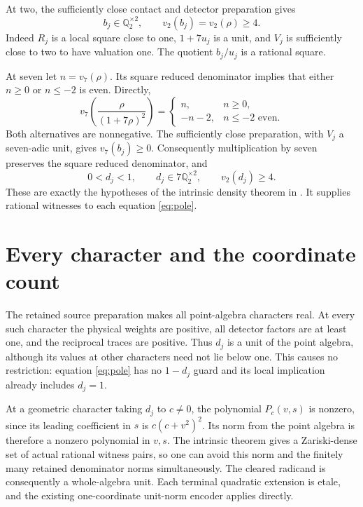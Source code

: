 \documentclass[11pt,a4paper]{article}
\newcommand{\Q}{\mathbb Q}
\begin{document}
At two, the sufficiently close contact and detector preparation gives
\[
 b_j\in\Q_2^{\times2},\qquad
 v_2(b_j)=v_2(\rho)\ge4.
\]
Indeed \(R_j\) is a local square close to one,
\(1+7u_j\) is a unit, and \(V_j\) is sufficiently close to two
to have valuation one. The quotient \(b_j/u_j\) is a rational square.

At seven let \(n=v_7(\rho)\). Its square reduced denominator
implies that either \(n\ge0\) or \(n\le-2\) is even. Directly,
\[
 v_7\left(\frac{\rho}{(1+7\rho)^2}\right)
 =\begin{cases}n,&n\ge0,\\-n-2,&n\le-2\text{ even}.
 \end{cases}
\]
Both alternatives are nonnegative. The sufficiently close preparation,
with \(V_j\) a seven-adic unit, gives \(v_7(b_j)\ge0\).
Consequently multiplication by seven preserves the square reduced
denominator, and
\[
 0<d_j<1,\qquad d_j\in7\Q_2^{\times2},\qquad v_2(d_j)\ge4.
\]
These are exactly the hypotheses of the intrinsic density theorem
in \cite{Intrinsic}. It supplies rational witnesses to each equation
\eqref{eq:pole}.

\section{Every character and the coordinate count}

The retained source preparation makes all point-algebra characters
real. At every such character the physical weights are positive,
all detector factors are at least one, and the reciprocal traces
are positive. Thus \(d_j\) is a unit of the point algebra, although
its values at other characters need not lie below one.
This causes no restriction: equation \eqref{eq:pole} has no
\(1-d_j\) guard and its local implication already includes \(d_j=1\).

At a geometric character taking \(d_j\) to \(c\ne0\), the
polynomial \(P_c(v,s)\) is nonzero, since its leading coefficient
in \(s\) is \(c(c+v^2)^2\). Its norm from the point algebra is
therefore a nonzero polynomial in \(v,s\). The intrinsic theorem
gives a Zariski-dense set of actual rational witness pairs, so one
can avoid this norm and the finitely many retained denominator
norms simultaneously. The cleared radicand is consequently a
whole-algebra unit. Each terminal quadratic extension is etale,
and the existing one-coordinate unit-norm encoder applies directly.
\end{document}
